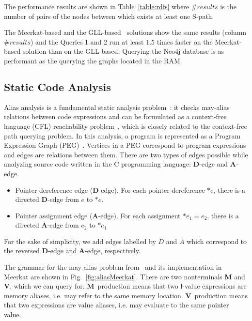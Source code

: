The performance results are shown in Table~\ref{table:rdfs} where $\#results$ is the number of pairs of the nodes between which exists at least one S-path.

The Meerkat-based and the GLL-based~\cite{GrigorevR16} solutions show the same results (column $\#results$) and the Queries 1 and 2 run at least $1.5$ times faster on the Meerkat-based solution than on the GLL-based. Querying the Neo4j database is as performant as the querying the graphs located in the RAM.


\subsection{Static Code Analysis}

Alias analysis is a fundamental static analysis problem~\cite{Marlowe}: it checks may-alias relations between code expressions and can be formulated as a context-free language (CFL) reachability problem~\cite{Reps}, which is closely related to the context-free path querying problem.
In this analysis, a program is represented as a Program Expression Graph (PEG)~\cite{Zheng}.
Vertices in a PEG correspond to program expressions and edges are relations between them.
There are two types of edges possible while analyzing source code written in the C programming language: \textbf{D}-edge and \textbf{A}-edge.

\begin{itemize}
    \item Pointer dereference edge (\textbf{D}-edge). For each pointer dereference $*e$, there is a directed \textbf{D}-edge from $e$ to $*e$.
    \item Pointer assignment edge (\textbf{A}-edge). For each assignment $*e_1=e_2$, there is a directed \textbf{A}-edge from $e_2$ to $*e_1$
\end{itemize}

For the sake of simplicity, we add edges labelled by $\overline{D}$ and $\overline{A}$ which correspond to the reversed \textbf{D}-edge and \textbf{A}-edge, respectively.

The grammar for the may-alias problem from~\cite{Zheng} and its implementation in Meerkat are shown in Fig.~\ref{fig:aliasMeerkat}.
There are two nonterminals \textbf{M} and \textbf{V}, which we can query for.
\textbf{M}~production means that two l-value expressions are memory aliases, i.e. may refer to the same memory location.
\textbf{V}~production means that two expressions are value aliases, i.e. may evaluate to the same pointer value.

